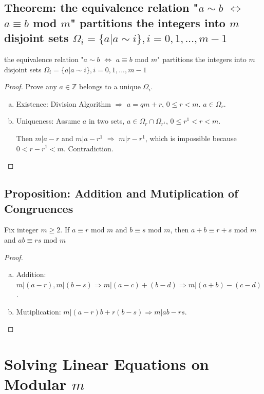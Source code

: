 \documentclass[11pt]{elegantbook}
\begin{document}
\subsection{Theorem: the equivalence relation "$a\sim b$ $\Leftrightarrow$ $a\equiv b$ mod $m$" partitions the integers into $m$ disjoint sets $\Omega_i=\{a|a\sim i\},i=0,1,...,m-1$}
\begin{theorem}
    the equivalence relation "$a\sim b$ $\Leftrightarrow$ $a\equiv b$ mod $m$" partitions the integers into $m$ disjoint sets $\Omega_i=\{a|a\sim i\},i=0,1,...,m-1$
\end{theorem}
\begin{proof}
    Prove any $a\in \mathbb{Z}$ belongs to a unique $\Omega_i$.

    \begin{enumerate}[a)]
        \item Existence: Division Algorithm $\Rightarrow$ $a=qm+r$, $0\leq r<m$. $a\in\Omega_r$.
        \item Uniqueness: Assume $a$ in two sets, $a\in\Omega_r\cap \Omega_{r^1}$, $0\leq r^1<r<m$.
        
        Then $m|a-r$ and $m|a-r^1$ $\Rightarrow$ $m|r-r^1$, which is impossible because $0<r-r^1<m$. Contradiction.
    \end{enumerate}
\end{proof}

\subsection{Proposition: Addition and Mutiplication of Congruences}
\begin{proposition}
    Fix integer $m\geq 2$. If $a\equiv r \text{ mod }m$ and $b\equiv s \text{ mod }m$, then $a+b\equiv r+s \text{ mod }m$ and $ab\equiv rs \text{ mod }m$
\end{proposition}
\begin{proof}
\quad

\begin{enumerate}[a)]
    \item Addition: $m|(a-r), m|(b-s)\Rightarrow m|(a-c)+(b-d)\Rightarrow m|(a+b)-(c-d)$.
    \item Mutiplication: $m|(a-r)b+r(b-s)\Rightarrow m|ab-rs$.
\end{enumerate}
\end{proof}

\section{Solving Linear Equations on Modular $m$}
\end{document}
